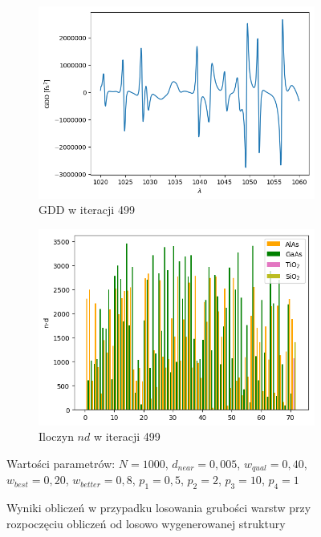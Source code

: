 \begin{figure} [H]
\begin{subfigure}[b]{0.31\textwidth}
        \includegraphics[width=\linewidth]{figures/wyniki/losowe/d/result_gddresult499.png}
        \caption{GDD w iteracji 499}
    \end{subfigure}
        \begin{subfigure}[b]{0.32\textwidth}
        \includegraphics[width=\linewidth]{figures/wyniki/losowe/d/result_ndresult499.png}
        \caption{Iloczyn $nd$ w iteracji 499}
    \end{subfigure}
    \caption{Wyniki obliczeń w przypadku losowania grubości warstw przy rozpoczęciu obliczeń od losowo wygenerowanej struktury}
    Wartości parametrów: $N=1000$, $d_{near}= 0,005$, $w_{qual}=0,40$, $w_{best}=0,20$, $w_{better}=0,8$, $p_1=0,5$, $p_2=2$, $p_3=10$, $p_4=1$
    \label{fig:wynlosd}
\end{figure}


